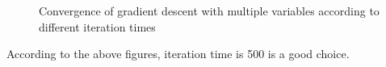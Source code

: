 \documentclass{article}
\begin{document}
\begin{itemize}
\begin{figure}[htbp]
    \caption{Convergence of gradient descent with multiple variables according to different iteration times}
\end{figure}

According to the above figures, iteration time is 500 is a good choice.
\end{itemize}
\pagebreak
\end{document}
